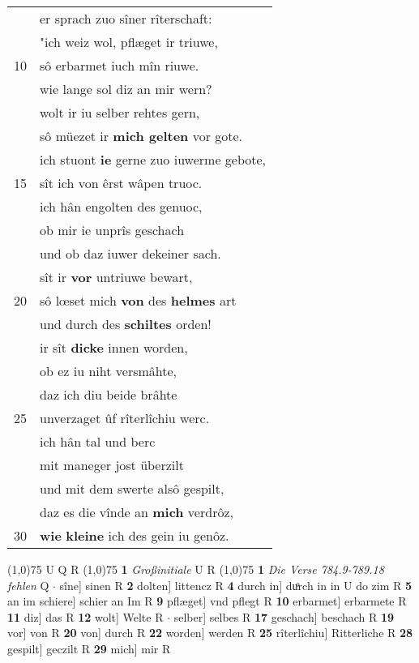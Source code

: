 \documentclass[8pt,a4paper,notitlepage]{article}
\begin{document}
\begin{table}[ht]
\begin{minipage}[t]{0.5\linewidth}
\begin{tabular}{rl}
 & er sprach zuo sîner rîterschaft:\\ 
 & "ich weiz wol, pflæget ir triuwe,\\ 
10 & sô erbarmet iuch mîn riuwe.\\ 
 & wie lange sol diz an mir wern?\\ 
 & wolt ir iu selber rehtes gern,\\ 
 & sô müezet ir \textbf{mich gelten} vor gote.\\ 
 & ich stuont \textbf{ie} gerne zuo iuwerme gebote,\\ 
15 & sît ich von êrst wâpen truoc.\\ 
 & ich hân engolten des genuoc,\\ 
 & ob mir ie unprîs geschach\\ 
 & und ob daz iuwer dekeiner sach.\\ 
 & sît ir \textbf{vor} untriuwe bewart,\\ 
20 & sô lœset mich \textbf{von} des \textbf{helmes} art\\ 
 & und durch des \textbf{schiltes} orden!\\ 
 & ir sît \textbf{dicke} innen worden,\\ 
 & ob ez iu niht versmâhte,\\ 
 & daz ich diu beide brâhte\\ 
25 & unverzaget ûf rîterlîchiu werc.\\ 
 & ich hân tal und berc\\ 
 & mit maneger jost überzilt\\ 
 & und mit dem swerte alsô gespilt,\\ 
 & daz es die vînde an \textbf{mich} verdrôz,\\ 
30 & \textbf{wie} \textbf{kleine} ich des gein iu genôz.\\ 
\end{tabular}
\scriptsize
\line(1,0){75} \newline
U Q R \newline
\line(1,0){75} \newline
\textbf{1} \textit{Großinitiale} U R  \newline
\line(1,0){75} \newline
\textbf{1} \textit{Die Verse 784.9-789.18 fehlen} Q   $\cdot$ sîne] sinen R \textbf{2} dolten] littencz R \textbf{4} durch in] duͦrch in in U do zim R \textbf{5} an im schiere] schier an Im R \textbf{9} pflæget] vnd pflegt R \textbf{10} erbarmet] erbarmete R \textbf{11} diz] das R \textbf{12} wolt] Welte R  $\cdot$ selber] selbes R \textbf{17} geschach] beschach R \textbf{19} vor] von R \textbf{20} von] durch R \textbf{22} worden] werden R \textbf{25} rîterlîchiu] Ritterliche R \textbf{28} gespilt] geczilt R \textbf{29} mich] mir R \newline
\end{minipage}
\end{table}
\end{document}

